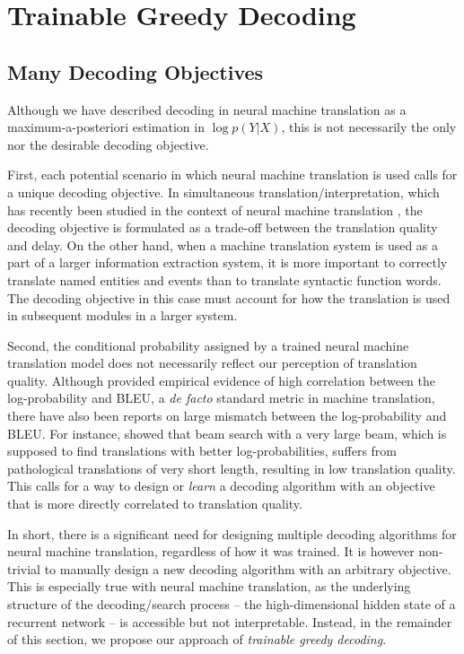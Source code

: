 \section{Trainable Greedy Decoding}

\subsection{Many Decoding Objectives}
Although we have described decoding in neural machine translation as a maximum-a-posteriori estimation in $\log p(Y|X)$, this is not necessarily the only %
nor the desirable decoding objective. 

First, each potential scenario in which neural machine translation is used calls for a unique decoding objective. In simultaneous translation/interpretation, which has recently been studied in the context of neural machine translation \citep{gu2016learning}, the decoding objective is formulated as a trade-off between the translation quality and delay. On the other hand, when a machine translation system is used as a part of a larger information extraction system, it is more important to correctly translate named entities and events than to translate syntactic function words. The decoding objective in this case must account for how the translation is used in subsequent modules in a larger system. 

Second, the conditional probability assigned by a trained neural machine translation model does not necessarily reflect our perception of translation quality. Although \citet{cho2016noisy} provided empirical evidence of high correlation between the log-probability and BLEU, a {\it de facto} standard metric in machine translation, there have also been reports on large mismatch between the log-probability and BLEU. For instance, \citet{tu2016neural} showed that beam search with a very large beam, which is supposed to find translations with better log-probabilities, suffers from pathological translations of very short length, resulting in low translation quality. This calls for a way to design or {\it learn} a decoding algorithm with an objective that is more directly correlated to translation quality. 

In short, there is a significant need for designing multiple decoding algorithms for neural machine translation, regardless of how it was trained. It is however non-trivial to manually design a new decoding algorithm with an arbitrary objective. This is especially true with neural machine translation, as the underlying structure of the decoding/search process -- the high-dimensional hidden state of a recurrent network -- is accessible but not interpretable. Instead, in the remainder of this section, we propose our approach of {\it trainable greedy decoding}.




